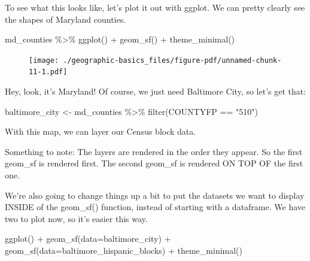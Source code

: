 \documentclass[
  letterpaper,
  DIV=11,
  numbers=noendperiod]{scrreprt}
\newenvironment{Shaded}{\begin{snugshade}}{\end{snugshade}}
\newcommand{\AttributeTok}[1]{\textcolor[rgb]{0.40,0.45,0.13}{#1}}
\newcommand{\FunctionTok}[1]{\textcolor[rgb]{0.28,0.35,0.67}{#1}}
\newcommand{\NormalTok}[1]{\textcolor[rgb]{0.00,0.23,0.31}{#1}}
\newcommand{\OtherTok}[1]{\textcolor[rgb]{0.00,0.23,0.31}{#1}}
\newcommand{\SpecialCharTok}[1]{\textcolor[rgb]{0.37,0.37,0.37}{#1}}
\newcommand{\StringTok}[1]{\textcolor[rgb]{0.13,0.47,0.30}{#1}}
\begin{document}
To see what this looks like, let's plot it out with ggplot. We can
pretty clearly see the shapes of Maryland counties.

\begin{Shaded}
\begin{Highlighting}[]
\NormalTok{md\_counties }\SpecialCharTok{\%\textgreater{}\%}
  \FunctionTok{ggplot}\NormalTok{() }\SpecialCharTok{+}
  \FunctionTok{geom\_sf}\NormalTok{() }\SpecialCharTok{+}
  \FunctionTok{theme\_minimal}\NormalTok{()}
\end{Highlighting}
\end{Shaded}

\begin{figure}[H]

{\centering \texttt{[image: ./geographic-basics\_files/figure-pdf/unnamed-chunk-11-1.pdf]}

}

\end{figure}

Hey, look, it's Maryland! Of course, we just need Baltimore City, so
let's get that:

\begin{Shaded}
\begin{Highlighting}[]
\NormalTok{baltimore\_city }\OtherTok{\textless{}{-}}\NormalTok{ md\_counties }\SpecialCharTok{\%\textgreater{}\%}
  \FunctionTok{filter}\NormalTok{(COUNTYFP }\SpecialCharTok{==} \StringTok{"510"}\NormalTok{)}
\end{Highlighting}
\end{Shaded}

With this map, we can layer our Census block data.

Something to note: The layers are rendered in the order they appear. So
the first geom\_sf is rendered first. The second geom\_sf is rendered ON
TOP OF the first one.

We're also going to change things up a bit to put the datasets we want
to display INSIDE of the geom\_sf() function, instead of starting with a
dataframe. We have two to plot now, so it's easier this way.

\begin{Shaded}
\begin{Highlighting}[]
\FunctionTok{ggplot}\NormalTok{() }\SpecialCharTok{+}
  \FunctionTok{geom\_sf}\NormalTok{(}\AttributeTok{data=}\NormalTok{baltimore\_city) }\SpecialCharTok{+}
  \FunctionTok{geom\_sf}\NormalTok{(}\AttributeTok{data=}\NormalTok{baltimore\_hispanic\_blocks) }\SpecialCharTok{+}
  \FunctionTok{theme\_minimal}\NormalTok{()}
\end{Highlighting}
\end{Shaded}
\end{document}
